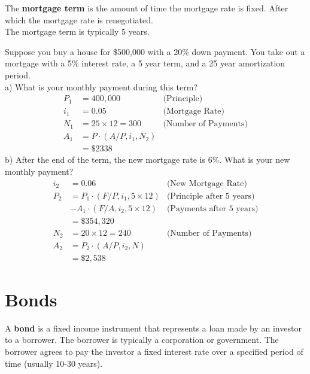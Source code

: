 \begin{definition}
    The \textbf{mortgage term} is the amount of time the mortgage rate is fixed. After which the mortgage rate is renegotiated.
    \\ The mortgage term is typically 5 years.
\end{definition}

\begin{example}
    Suppose you buy a house for \$500,000 with a 20\% down payment. You take out a mortgage with a 5\% interest rate, a 5 year term, and a 25 year amortization period. \\
    a) What is your monthly payment during this term?
    \begin{align*}
        P_1 &= 400,000 \quad &\text{(Principle)}\\
        i_1 &= 0.05 \quad &\text{(Mortgage Rate)}\\
        N_1 &= 25\times 12 = 300 \quad &\text{(Number of Payments)}\\
        A_1 &= P \cdot (A/P, i_1, N_2)\\
        &= \$ 2338
    \end{align*}    
    b) After the end of the term, the new mortgage rate is 6\%. What is your new monthly payment?
    \begin{align*}
        i_2 &= 0.06 \quad &\text{(New Mortgage Rate)}\\
        P_2 &= P_1\cdot (F/P, i_1, 5\times 12) &\text{(Principle after 5 years)}\\
        & - A_1\cdot (F/A, i_2, 5\times 12) &\text{(Payments after 5 years)}\\
        & = \$354,320 \\
        N_2 &= 20\times 12 = 240 \quad &\text{(Number of Payments)}\\
        A_2 &= P_2\cdot (A/P, i_2, N)\\
        &= \$ 2,538
    \end{align*}
\end{example}

\section{Bonds}

\begin{definition}
    [Bond]
    A \textbf{bond} is a fixed income instrument that represents a loan made by an investor to a borrower. The borrower is typically a corporation or government. The borrower agrees to pay the investor a fixed interest rate over a specified period of time (usually 10-30 years).
\end{definition}

